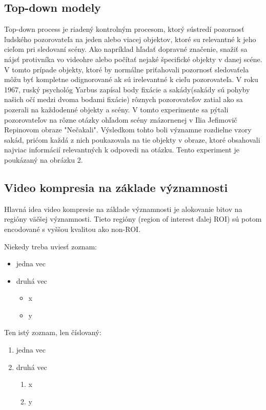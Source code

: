 \documentclass[10pt,twoside,slovak,a4paper]{article}
\begin{document}
\subsection{Top-down modely} \label{nejaka}
Top-down process je riadený kontrolným procesom, ktorý sústredí pozornosť ľudského pozorovateľa na jeden alebo viacej objektov, ktoré su relevantné k jeho cieľom pri sledovaní scény. Ako napríklad hľadať dopravné značenie, snažiť sa nájsť  protivníka vo videohre alebo počítať nejaké špecifické objekty v danej scéne. V tomto prípade objekty, ktoré by normálne priťahovali pozornosť sledovaťela môžu byť kompletne odignorované ak sú irelevantné k cieľu pozorovateľa. V roku 1967, ruský psychológ Yarbus zapísal body fixácie a sakády(sakády sú pohyby našich očí medzi dvoma bodami fixácie) rôznych pozorovateľov zatial ako sa pozerali na každodenné objekty a scény. V tomto experimente sa pýtali pozorovateľov na rôzne otázky ohľadom scény znázornenej v Ilia Jefimovič Repinovom  obraze "Nečakali". Výsledkom tohto boli významne rozdielne vzory sakád, prićom každá z nich poukazovala na tie objekty v obraze, ktoré obsahovali najviac informácií relevantných k odpovedi na otázku. Tento experiment je poukázaný na obrázku 2.
\subsection{Video kompresia na základe významnosti}
Hlavná idea video kompresie na základe významnosti je alokovanie bitov na regióny väčšej významnosti. Tieto regióny (region of interest ďalej ROI) sú potom encodované s vyššou kvalitou ako non-ROI.%

Niekedy treba uviesť zoznam:
\begin{itemize}
\item jedna vec
\item druhá vec
	\begin{itemize}
	\item x
	\item y
	\end{itemize}
\end{itemize}
Ten istý zoznam, len číslovaný:
\begin{enumerate}
\item jedna vec
\item druhá vec
	\begin{enumerate}
	\item x
	\item y
	\end{enumerate}
\end{enumerate}
\end{document}
